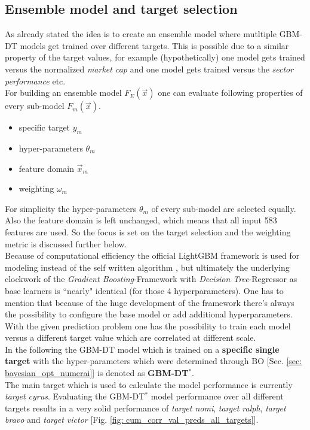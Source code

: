 \documentclass[12pt, a4paper]{article}
\begin{document}
\subsection{Ensemble model and target selection}
As already stated the idea is to create an ensemble model where mutltiple GBM-DT models get trained over different targets. This is possible due to a similar property of the target values, for example (hypothetically) one model gets trained versus the normalized \textit{market cap} and one model gets trained versus the \textit{sector performance} etc. \\
For building an ensemble model $F_E(\vec{x})$ one can evaluate following properties of every sub-model $F_m(\vec{x})$.
\begin{itemize}
    \item specific target $y_m$
    \item hyper-parameters $\theta_m$
    \item feature domain $\vec{x}_m$
    \item weighting $\omega_m$
\end{itemize}
For simplicity the hyper-parameters $\theta_m$ of every sub-model are selected equally. Also the feature domain is left unchanged, which means that all input 583 features are used. So the focus is set on the target selection and the weighting metric is discussed further below. \\
Because of computational efficiency the official LightGBM framework \cite{LightGBM} is used for modeling instead of the self written algorithm \cite{Gschaider}, but ultimately the underlying clockwork of the \textit{Gradient Boosting}-Framework with \textit{Decision Tree}-Regressor as base learners is ``nearly" identical (for those 4 hyperparameters). One has to mention that because of the huge development of the framework there's always the possibility to configure the base model or add additional hyperparameters. With the given prediction problem one has the possibility to train each model versus a different target value which are correlated at different scale. \\
In the following the GBM-DT model which is trained on a \textbf{specific single target} with the hyper-parameters which were determined through BO [Sec. \ref{sec: bayesian_opt_numerai}] is denoted as \textbf{GBM-DT$^{\ast}$}. \\
The main target which is used to calculate the model performance is currently \textit{target cyrus}. Evaluating the GBM-DT$^{\ast}$ model performance over all different targets results in a very solid performance of \textit{target nomi}, \textit{target ralph}, \textit{target bravo} and \textit{target victor} [Fig. \ref{fig: cum_corr_val_preds_all_targets}]. \\
\end{document}
